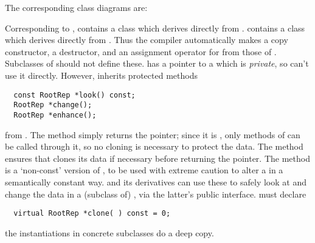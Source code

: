The corresponding class diagrams are:


\vspace{20pt}


\vspace{20pt}


Corresponding to ,  contains a class
 which derives directly from .
 contains a class  which derives directly
from .  Thus the compiler automatically makes
a copy constructor, a destructor, and an assignment operator for
 from those of .  Subclasses of
 should not define these.   has
a pointer to a  which is {\em private}, so
 can't use it directly. However,  inherits
protected methods

\lskip
\begin{verbatim}
  const RootRep *look() const;
  RootRep *change();
  RootRep *enhance();
\end{verbatim}
\lskip

\noindent from . The  method simply
returns the pointer; since it is , only 
methods of  can be called through it, so no cloning is
necessary to protect the data.  The  method ensures
that  clones its data if necessary before returning the
pointer.  The  method is a `non-const' version of
, to be used with extreme caution to alter a  in
a semantically constant way.   and its derivatives can
use these to safely look at and change the data in a (subclass of)
, via the latter's public interface.  must
declare

\begin{verbatim}
  virtual RootRep *clone( ) const = 0;
\end{verbatim}

\noindent the instantiations in concrete subclasses do a deep copy.

